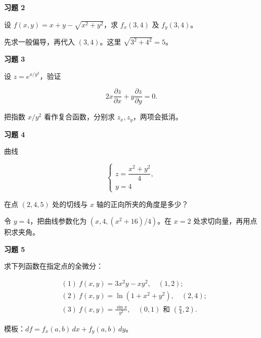 \begin{exercisebox}
\textbf{习题 2}

设 \(f(x,y)=x+y-\sqrt{x^2+y^2}\)，求 \(f_x(3,4)\) 及 \(f_y(3,4)\)。

\begin{hintbox}
先求一般偏导，再代入 \((3,4)\)。这里 \(\sqrt{3^2+4^2}=5\)。
\end{hintbox}
\end{exercisebox}

\begin{exercisebox}
\textbf{习题 3}

设 \(z=e^{x/y^2}\)，验证

\[
        2x\frac{\partial z}{\partial x}
        +y\frac{\partial z}{\partial y}=0.
      \]

\begin{hintbox}
把指数 \(x/y^2\) 看作复合函数，分别求 \(z_x,z_y\)，两项会抵消。
\end{hintbox}
\end{exercisebox}

\begin{exercisebox}
\textbf{习题 4}

曲线

\[
        \begin{cases}
        z=\dfrac{x^2+y^2}{4},\\
        y=4
        \end{cases}
      \]

在点 \((2,4,5)\) 处的切线与 \(x\) 轴的正向所夹的角度是多少？

\begin{hintbox}
令 \(y=4\)，把曲线参数化为 \((x,4,(x^2+16)/4)\)。在 \(x=2\) 处求切向量，再用点积求夹角。
\end{hintbox}
\end{exercisebox}

\begin{exercisebox}
\textbf{习题 5}

求下列函数在指定点的全微分：

\[
      \begin{aligned}
      &(1)\ f(x,y)=3x^2y-xy^2,\quad (1,2);\\
      &(2)\ f(x,y)=\ln(1+x^2+y^2),\quad (2,4);\\
      &(3)\ f(x,y)=\frac{\sin x}{y^2},\quad (0,1)\text{ 和 }\left(\frac{\pi}{4},2\right).
      \end{aligned}
      \]

\begin{hintbox}
模板：\(df=f_x(a,b)\,dx+f_y(a,b)\,dy\)。
\end{hintbox}
\end{exercisebox}


